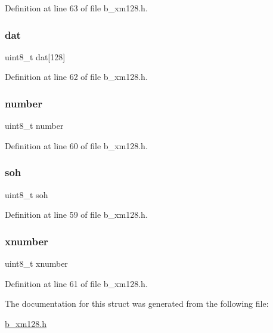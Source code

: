 Definition at line 63 of file b\+\_\+xm128.\+h.

\mbox{\label{structb_xmodem128_info__t_ab02bda4989472488cf520fd11c64a230}} 
\subsubsection{\texorpdfstring{dat}{dat}}
{\footnotesize\ttfamily uint8\+\_\+t dat\mbox{[}128\mbox{]}}



Definition at line 62 of file b\+\_\+xm128.\+h.

\mbox{\label{structb_xmodem128_info__t_af57eaec6f3dec6de717735725c9908a6}} 
\subsubsection{\texorpdfstring{number}{number}}
{\footnotesize\ttfamily uint8\+\_\+t number}



Definition at line 60 of file b\+\_\+xm128.\+h.

\mbox{\label{structb_xmodem128_info__t_a87bdcb2d9de9c3eef834e0af26f2d5e3}} 
\subsubsection{\texorpdfstring{soh}{soh}}
{\footnotesize\ttfamily uint8\+\_\+t soh}



Definition at line 59 of file b\+\_\+xm128.\+h.

\mbox{\label{structb_xmodem128_info__t_ae817be61f4d69f01a76ff417b23f5a54}} 
\subsubsection{\texorpdfstring{xnumber}{xnumber}}
{\footnotesize\ttfamily uint8\+\_\+t xnumber}



Definition at line 61 of file b\+\_\+xm128.\+h.



The documentation for this struct was generated from the following file\+:\begin{DoxyCompactItemize}
\item 
\mbox{\hyperlink{b__xm128_8h}{b\+\_\+xm128.\+h}}\end{DoxyCompactItemize}
